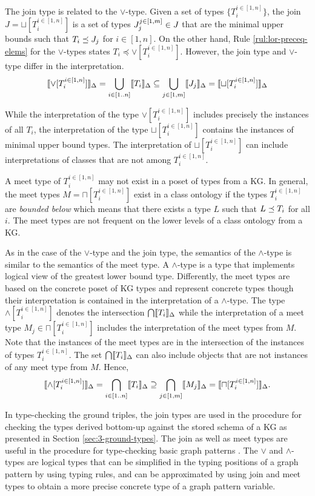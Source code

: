 \documentclass[runningheads]{llncs}
\newcommand{\llb}{\llbracket}
\newcommand{\rrb}{\rrbracket}
\begin{document}
The join type is related to the $\lor$-type. Given a set of types
$\{T_i^{i\in[1,n]}\}$, the join $J=\sqcup[T_i^{i\in[1,n]}]$ is a set
of types $J_j^{j\in[1,m]}\in\/J$ that are the minimal upper bounds
such that $T_i\preceq\/J_j$ for $i\in[1,n]$. On the other hand,
Rule \ref{rul:lor-preceq-elems} for the $\lor$-types states
$T_i\preceq\lor[T_i^{i\in[1,n]}]$. However, the join type and
$\lor$-type differ in the interpretation.
$$\llb\lor[T_i^{i\in[1,n]}]\rrb_\D=\bigcup_{i\in[1..n]}\llb\/T_i\rrb_\D\subseteq\bigcup_{j\in[1,m]}\llb\/J_j\rrb_\D=\llb\sqcup[T_i^{i\in[1,n]}]\rrb_\D$$

While the interpretation of the type $\lor[T_i^{i\in[1,n]}]$ includes
precisely the instances of all $T_i$, the interpretation of the type
$\sqcup[T_i^{i\in[1,n]}]$ contains the instances of minimal upper bound
types. The interpretation of $\sqcup[T_i^{i\in[1,n]}]$ can include
interpretations of classes that are not among $T_i^{i\in[1,n]}$.

A meet type of $T_i^{i\in[1,n]}$ may not exist in a poset of types
from a KG. In general, the meet types $M=\sqcap[T_i^{i\in[1,n]}]$
exist in a class ontology if the types $T_i^{i\in[1,n]}$ are
\emph{bounded below} \cite{Pierce2002} which means that there exists a
type $L$ such that $L\preceq\/T_i$ for all $i$. The meet types are not
frequent on the lower levels of a class ontology from a KG.

As in the case of the $\lor$-type and the join type, the semantics of
the $\land$-type is similar to the semantics of the meet type. A
$\land$-type is a type that implements logical view of the greatest
lower bound type. Differently, the meet types are based on the
concrete poset of KG types and represent concrete types though their
interpretation is contained in the interpretation of a
$\land$-type. The type $\land[T_i^{i\in[1,n]}]$ denotes the
intersection $\bigcap\/\llb\/T_i\rrb_\D$ while the interpretation of a
meet type $M_j\in\sqcap[T_i^{i\in[1,n]}]$ includes the interpretation
of the meet types from $M$. Note that the instances of the meet types
are in the intersection of the instances of types
$T_i^{i\in[1,n]}$. The set $\bigcap\/\llb\/T_i\rrb_\D$ can also
include objects that are not instances of any meet type from
$M$. Hence,
$$\llb\land[T_i^{i\in[1,n]}]\rrb_\D=\bigcap_{i\in[1..n]}\/\llb\/T_i\rrb_\D\supseteq\bigcap_{j\in[1,m]}\llb\/M_j\rrb_\D=\llb\sqcap[T_i^{i\in[1,n]}]\rrb_\D.$$

In type-checking the ground triples, the join types are used in the
procedure for checking the types derived bottom-up against the stored
schema of a KG as presented in Section \ref{sec:3-ground-types}. The
join as well as meet types are useful in the procedure for
type-checking basic graph patterns \cite{Savnik2025a}. The $\lor$ and
$\land$-types are logical types that can be simplified in the typing
positions of a graph pattern by using typing rules, and can be
approximated by using join and meet types to obtain a more precise
concrete type of a graph pattern variable.
\end{document}
